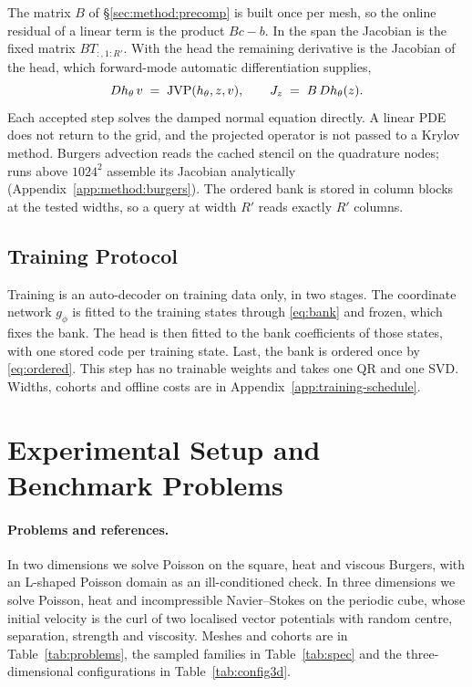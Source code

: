 \documentclass{article}
\begin{document}
The matrix $B$ of \S\ref{sec:method:precomp} is built once per mesh, so
the online residual of a linear term is the product $Bc-b$. In the span
the Jacobian is the fixed matrix $BT_{:,1:R'}$. With the head the
remaining derivative is the Jacobian of the head, which forward-mode
automatic differentiation \citep{Bradbury2018JAX} supplies,
\begin{equation}
  Dh_\theta\, v \;=\; \mathrm{JVP}(h_\theta,z,v),
  \qquad
  J_z \;=\; B\,Dh_\theta(z).
  \label{eq:jvp}
\end{equation}
Each accepted step solves the damped normal equation directly. A linear
PDE does not return to the grid, and the projected operator is not passed
to a Krylov method. Burgers advection reads the cached stencil on the
quadrature nodes; runs above $1024^2$ assemble its Jacobian analytically
(Appendix~\ref{app:method:burgers}). The ordered bank is stored in column
blocks at the tested widths, so a query at width $R'$ reads exactly $R'$
columns.

\subsection{Training Protocol}

Training is an auto-decoder on training data only, in two stages. The
coordinate network $g_\phi$ is fitted to the training states through
\eqref{eq:bank} and frozen, which fixes the bank. The head is then fitted
to the bank coefficients of those states, with one stored code per
training state. Last, the bank is ordered once by \eqref{eq:ordered}. This
step has no trainable weights and takes one QR and one SVD. Widths,
cohorts and offline costs are in Appendix~\ref{app:training-schedule}.

\section{Experimental Setup and Benchmark Problems}
\label{sec:setup}
\restoredisplays

\paragraph{Problems and references.}
In two dimensions we solve Poisson on the square, heat and viscous
Burgers, with an L-shaped Poisson domain as an ill-conditioned check. In
three dimensions we solve Poisson, heat and incompressible
Navier--Stokes on the periodic cube, whose initial velocity is the curl of
two localised vector potentials with random centre, separation, strength
and viscosity. Meshes and cohorts are in Table~\ref{tab:problems}, the
sampled families in Table~\ref{tab:spec} and the three-dimensional
configurations in Table~\ref{tab:config3d}.
\end{document}
